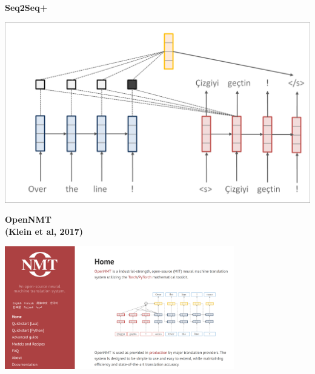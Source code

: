 \documentclass[aspectratio=169,12pt]{beamer}
\newcommand{\air}{\vspace{0.25cm}}
\begin{document}
\begin{frame}
  \begin{center}
    \textbf{Seq2Seq+} \air

  \end{center}
\center
\vspace{-5mm}
 \air
\includegraphics[scale=0.37]{nmt-attn10}
\end{frame}









\begin{frame}
  \begin{center}
    \textbf{OpenNMT\\ {\small (Klein et al, 2017)}}

  \includegraphics[width=10cm]{opennmt}
  \end{center}

\end{frame}
\end{document}
